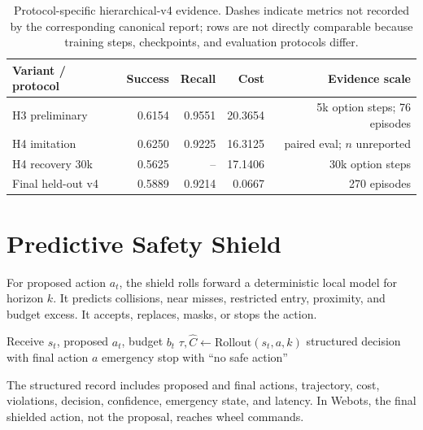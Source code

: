 \documentclass[conference]{IEEEtran}
\begin{document}
\begin{table}[t]
\centering
\caption{Protocol-specific hierarchical-v4 evidence. Dashes indicate metrics
not recorded by the corresponding canonical report; rows are not directly
comparable because training steps, checkpoints, and evaluation protocols differ.}
\label{tab:hierarchical}
\scriptsize
\begin{tabular}{lrrrr}
\toprule
Variant / protocol & Success & Recall & Cost & Evidence scale\\
\midrule
H3 preliminary & 0.6154 & 0.9551 & 20.3654 & 5k option steps; 76 episodes\\
H4 imitation & 0.6250 & 0.9225 & 16.3125 & paired eval; $n$ unreported\\
H4 recovery 30k & 0.5625 & -- & 17.1406 & 30k option steps\\
Final held-out v4 & 0.5889 & 0.9214 & 0.0667 & 270 episodes\\
\bottomrule
\end{tabular}
\end{table}

\section{Predictive Safety Shield}
For proposed action $a_t$, the shield rolls forward a deterministic local model
for horizon $k$. It predicts collisions, near misses, restricted entry,
proximity, and budget excess. It accepts, replaces, masks, or stops the action.

\begin{algorithm}
\caption{Predictive shield}
\begin{algorithmic}[1]
\State Receive $s_t$, proposed $a_t$, budget $b_t$
  \State $\tau,\hat C\gets\mathrm{Rollout}(s_t,a,k)$
    \State \Return structured decision with final action $a$
  \EndIf
\EndFor
\State \Return emergency stop with ``no safe action''
\end{algorithmic}
\end{algorithm}

The structured record includes proposed and final actions, trajectory, cost,
violations, decision, confidence, emergency state, and latency. In Webots, the
final shielded action, not the proposal, reaches wheel commands.
\end{document}
